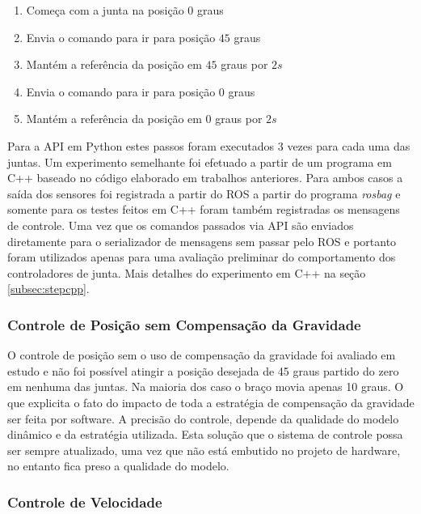 \begin{enumerate}
    \item Começa com a junta na posição $0$ graus
    \item Envia o comando para ir para posição $45$ graus
    \item Mantém a referência da posição em $45$ graus por $2s$
    \item Envia o comando para ir para posição $0$ graus
    \item Mantém a referência da posição em $0$ graus por $2s$
\end{enumerate}

Para a API em Python estes passos foram executados 3 vezes para cada uma das juntas. Um experimento semelhante foi efetuado a partir de um programa em C++ baseado no código elaborado em trabalhos anteriores. Para ambos casos a saída dos sensores foi registrada a partir do ROS a partir do programa \textit{rosbag} e somente para os testes feitos em C++ foram também registradas os mensagens de controle. Uma vez que os comandos passados via API são enviados diretamente para o serializador de mensagens sem passar pelo ROS e portanto foram utilizados apenas para uma avaliação preliminar do comportamento dos controladores de junta. Mais detalhes do experimento em C++ na seção \ref{subsec:stepcpp}. 


\subsubsection{Controle de Posição sem Compensação da Gravidade}

O controle de posição sem o uso de compensação da gravidade foi avaliado em estudo e não foi possível atingir a posição desejada de 45 graus partido do zero em nenhuma das juntas. Na maioria dos caso o braço movia apenas 10 graus. O que explicita o fato do impacto de toda a estratégia de compensação da gravidade ser feita por software. A precisão do controle, depende da qualidade do modelo dinâmico e da estratégia utilizada. Esta solução que o sistema de controle possa ser sempre atualizado, uma vez que não está embutido no projeto de hardware, no entanto fica preso a qualidade do modelo.

\subsubsection{Controle de Velocidade}

